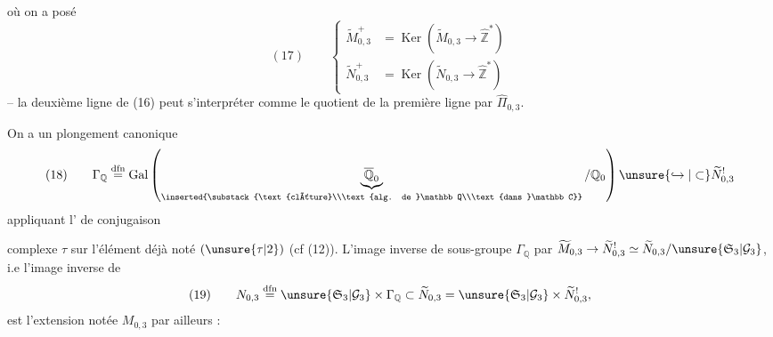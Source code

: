 où on a posé
\[
(17)\qquad
\left\{\begin{aligned}
\widetilde M_{0,3}^{+}&=\operatorname{Ker}(\widetilde M_{0,3}\to\widehat{\mathbb Z}^{*})\\
\widetilde N_{0,3}^{+}&=\operatorname{Ker}(\widetilde N_{0,3}\to\widehat{\mathbb Z}^{*})
\end{aligned}\right.
\]
-- la deuxième ligne de (16) peut s'interpréter comme le quotient de la première ligne par $\widehat\Pi_{0,3}$.

On a un plongement canonique
\[
(18)\qquad
\Gamma_{\mathbb Q}\overset{\mathrm{dfn}}{=}
\operatorname{Gal}\left(
\underbrace{\overline{\mathbb Q}_0}_{\inserted{\substack{\text{clôture}\\\text{alg. de }\mathbb Q\\\text{dans }\mathbb C}}}
/\mathbb Q_0\right)
\unsure{\hookrightarrow|\subset}\widetilde N_{0,3}^{!}
\]
appliquant l' de conjugaison


complexe $\tau$ sur l'élément déjà noté $(\unsure{\tau|2})$ (cf (12)). L'image inverse de  sous-groupe $\Gamma_{\mathbb Q}$  par $\widetilde M_{0,3}\to\widetilde N_{0,3}^{!}\simeq\widetilde N_{0,3}/\unsure{\mathfrak S_3|\mathcal G_3}$, i.e l'image inverse de 
\[
(19)\qquad
N_{0,3}\overset{\mathrm{dfn}}{=}
\unsure{\mathfrak S_3|\mathcal G_3}\times\Gamma_{\mathbb Q}
\subset\widetilde N_{0,3}
=\unsure{\mathfrak S_3|\mathcal G_3}\times\widetilde N_{0,3}^{!},
\]
est l'extension  notée $M_{0,3}$ par ailleurs :



